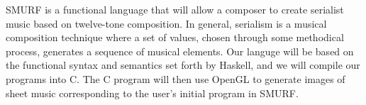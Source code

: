 SMURF is a functional language that will allow a composer to create serialist music
based on twelve-tone composition. In general, serialism is a musical composition
technique where a set of values, chosen through some methodical process, generates
a sequence of musical elements. Our languge will be based on the functional syntax
and semantics set forth by Haskell, and we will compile our programs into C.
The C program will then use OpenGL to generate images of sheet music corresponding to the user's
initial program in SMURF.
